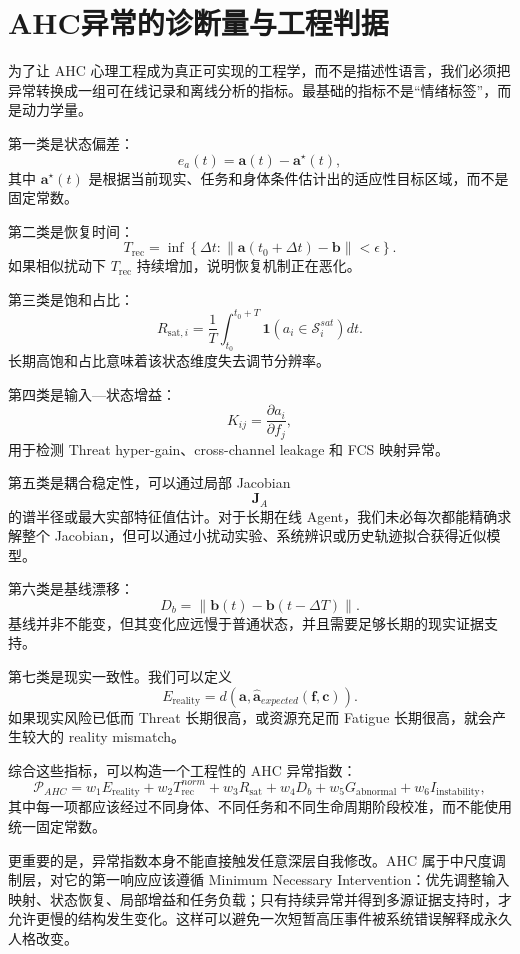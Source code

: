 \section{AHC异常的诊断量与工程判据}
\label{sec:ahc_diagnosis_metrics}

为了让 AHC 心理工程成为真正可实现的工程学，而不是描述性语言，我们必须把异常转换成一组可在线记录和离线分析的指标。最基础的指标不是“情绪标签”，而是动力学量。

第一类是状态偏差：
\[
e_a(t)
=
\mathbf a(t)-\mathbf a^\star(t),
\]
其中 $\mathbf a^\star(t)$ 是根据当前现实、任务和身体条件估计出的适应性目标区域，而不是固定常数。

第二类是恢复时间：
\[
T_{\mathrm{rec}}
=
\inf
\left\{
\Delta t:
\|\mathbf a(t_0+\Delta t)-\mathbf b\|
<\epsilon
\right\}.
\]
如果相似扰动下 $T_{\mathrm{rec}}$ 持续增加，说明恢复机制正在恶化。

第三类是饱和占比：
\[
R_{\mathrm{sat},i}
=
\frac{1}{T}
\int_{t_0}^{t_0+T}
\mathbf 1
\left(
a_i\in\mathcal S_i^{sat}
\right)
dt.
\]
长期高饱和占比意味着该状态维度失去调节分辨率。

第四类是输入—状态增益：
\[
K_{ij}
=
\frac{\partial a_i}{\partial f_j},
\]
用于检测 Threat hyper-gain、cross-channel leakage 和 FCS 映射异常。

第五类是耦合稳定性，可以通过局部 Jacobian
\[
\mathbf J_A
\]
的谱半径或最大实部特征值估计。对于长期在线 Agent，我们未必每次都能精确求解整个 Jacobian，但可以通过小扰动实验、系统辨识或历史轨迹拟合获得近似模型。

第六类是基线漂移：
\[
D_b
=
\|\mathbf b(t)-\mathbf b(t-\Delta T)\|.
\]
基线并非不能变，但其变化应远慢于普通状态，并且需要足够长期的现实证据支持。

第七类是现实一致性。我们可以定义
\[
E_{\mathrm{reality}}
=
d
\left(
\mathbf a,
\hat{\mathbf a}_{expected}
(\mathbf f,\mathbf c)
\right).
\]
如果现实风险已低而 Threat 长期很高，或资源充足而 Fatigue 长期很高，就会产生较大的 reality mismatch。

综合这些指标，可以构造一个工程性的 AHC 异常指数：
\[
\mathcal P_{AHC}
=
w_1E_{\mathrm{reality}}
+
w_2T_{\mathrm{rec}}^{norm}
+
w_3R_{\mathrm{sat}}
+
w_4D_b
+
w_5G_{\mathrm{abnormal}}
+
w_6I_{\mathrm{instability}},
\]
其中每一项都应该经过不同身体、不同任务和不同生命周期阶段校准，而不能使用统一固定常数。

更重要的是，异常指数本身不能直接触发任意深层自我修改。AHC 属于中尺度调制层，对它的第一响应应该遵循 Minimum Necessary Intervention：优先调整输入映射、状态恢复、局部增益和任务负载；只有持续异常并得到多源证据支持时，才允许更慢的结构发生变化。这样可以避免一次短暂高压事件被系统错误解释成永久人格改变。

